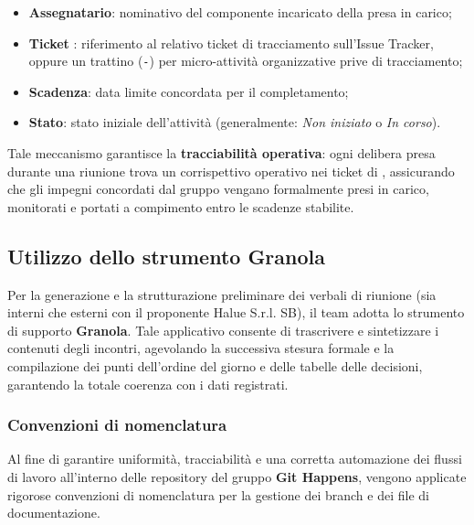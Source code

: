 \begin{itemize}
\begin{itemize}
        \item \textbf{Assegnatario}: nominativo del componente incaricato della presa in carico;
        \item \textbf{Ticket }: riferimento al relativo ticket di tracciamento sull'Issue Tracker, oppure un trattino (\texttt{-}) per micro-attività organizzative prive di tracciamento;
        \item \textbf{Scadenza}: data limite concordata per il completamento;
        \item \textbf{Stato}: stato iniziale dell'attività (generalmente: \textit{Non iniziato} o \textit{In corso}).
    \end{itemize}
\end{itemize}

\noindent Tale meccanismo garantisce la \textbf{tracciabilità operativa}: ogni delibera presa durante una riunione trova un corrispettivo operativo nei ticket di , assicurando che gli impegni concordati dal gruppo vengano formalmente presi in carico, monitorati e portati a compimento entro le scadenze stabilite.
\subsection{Utilizzo dello strumento Granola}
Per la generazione e la strutturazione preliminare dei verbali di riunione (sia interni che esterni con il proponente Halue S.r.l. SB), il team adotta lo strumento di supporto \textbf{Granola}. Tale applicativo consente di trascrivere e sintetizzare i contenuti degli incontri, agevolando la successiva stesura formale e la compilazione dei punti dell'ordine del giorno e delle tabelle delle decisioni, garantendo la totale coerenza con i dati registrati.

\subsubsection{Convenzioni di nomenclatura}
Al fine di garantire uniformità, tracciabilità e una corretta automazione dei flussi di lavoro all'interno delle repository del gruppo \textbf{Git Happens}, vengono applicate rigorose convenzioni di nomenclatura per la gestione dei branch e dei file di documentazione. 

